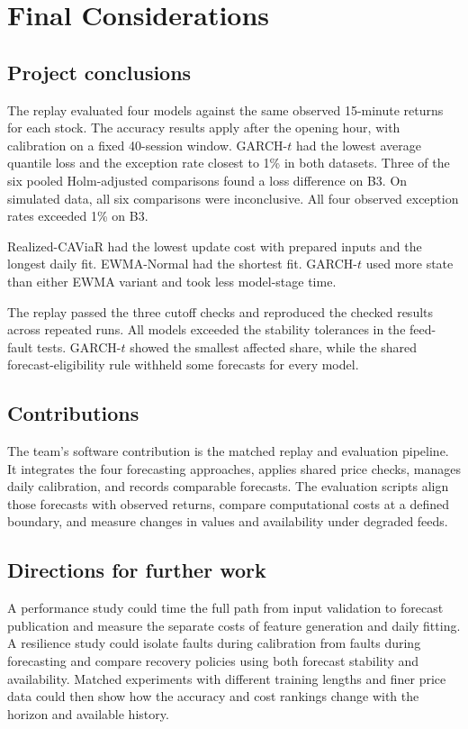 \documentclass[
	12pt,				%
	openright,			%
	twoside,			%
	a4paper,
	chapter=TITLE,
	english				%
	]{abntex2}
\begin{document}
\chapter{Final Considerations} \label{cap:consideracoes}

\section{Project conclusions}

The replay evaluated four models against the same observed 15-minute returns for each stock. The accuracy results apply after the opening hour, with calibration on a fixed 40-session window. GARCH-$t$ had the lowest average quantile loss and the exception rate closest to 1\% in both datasets. Three of the six pooled Holm-adjusted comparisons found a loss difference on B3. On simulated data, all six comparisons were inconclusive. All four observed exception rates exceeded 1\% on B3.

Realized-CAViaR had the lowest update cost with prepared inputs and the longest daily fit. EWMA-Normal had the shortest fit. GARCH-$t$ used more state than either EWMA variant and took less model-stage time.

The replay passed the three cutoff checks and reproduced the checked results across repeated runs. All models exceeded the stability tolerances in the feed-fault tests. GARCH-$t$ showed the smallest affected share, while the shared forecast-eligibility rule withheld some forecasts for every model.

\section{Contributions}

The team's software contribution is the matched replay and evaluation pipeline. It integrates the four forecasting approaches, applies shared price checks, manages daily calibration, and records comparable forecasts. The evaluation scripts align those forecasts with observed returns, compare computational costs at a defined boundary, and measure changes in values and availability under degraded feeds.

\section{Directions for further work}

A performance study could time the full path from input validation to forecast publication and measure the separate costs of feature generation and daily fitting. A resilience study could isolate faults during calibration from faults during forecasting and compare recovery policies using both forecast stability and availability. Matched experiments with different training lengths and finer price data could then show how the accuracy and cost rankings change with the horizon and available history.
\end{document}
